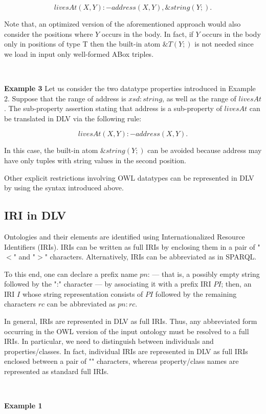 \documentclass[oneside]{book}
\begin{document}
\[
livesAt(X,Y) :- address(X,Y), \&string(Y;).
\]

Note that, an optimized version of the aforementioned approach would also consider the positions where $Y$ occurs in the body. In fact, if $Y$ occurs in the body only in positions of type T then the built-in atom $\&T(Y;)$ is not needed since we load in input only well-formed ABox triples.

\

\textbf{Example 3}
Let us consider the two datatype properties introduced in Example 2. Suppose that the range of address is $xsd:string$, as well as the range of $livesAt$. The sub-property assertion stating that address is a sub-property of $livesAt$ can be translated in DLV via the following rule:

\[
livesAt(X,Y) :- address(X,Y).
\]

In this case, the built-in atom $\&string(Y;)$ can be avoided because address may have only tuples with string values in the second position.

Other explicit restrictions involving OWL datatypes can be represented in DLV by using the syntax introduced above.

\subsection{IRI in DLV}

Ontologies and their elements are identified using Internationalized Resource Identifiers (IRIs). IRIs can be written as full IRIs by enclosing them in a pair of "$<$" and "$>$" characters. Alternatively, IRIs can be abbreviated as in SPARQL. 

To this end, one can declare a prefix name $pn$: — that is, a possibly empty string followed by the ":" character — by associating it with a prefix IRI $PI$; then, an IRI $I$ whose string representation consists of $PI$ followed by the remaining characters $rc$ can be abbreviated as $pn:rc$.

In general, IRIs are represented in DLV as full IRIs. Thus, any abbreviated form occurring in the OWL version of the input ontology must be resolved to a full IRIs. In particular, we need to distinguish between individuals and properties/classes. In fact, individual IRIs are represented in DLV as full IRIs enclosed between a pair of "" characters, whereas property/class names are represented as standard full IRIs.

\

\textbf{Example 1}
\end{document}
